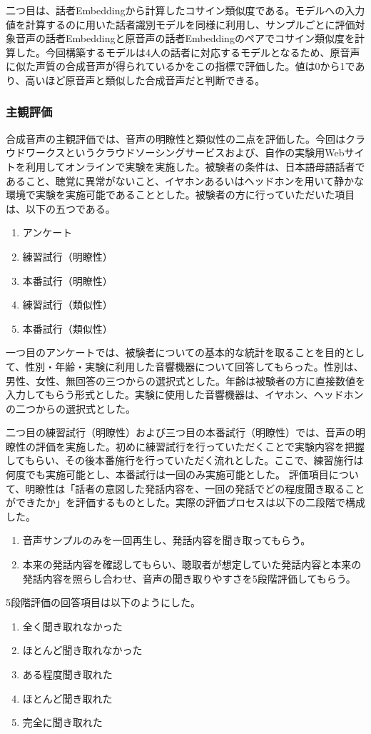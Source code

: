 \documentclass[12pt]{jarticle}
\numberwithin{equation}{section}    %
\numberwithin{figure}{section}      %
\numberwithin{table}{section}      %
\begin{document}
二つ目は、話者Embeddingから計算したコサイン類似度である。モデルへの入力値を計算するのに用いた話者識別モデルを同様に利用し、サンプルごとに評価対象音声の話者Embeddingと原音声の話者Embeddingのペアでコサイン類似度を計算した。今回構築するモデルは4人の話者に対応するモデルとなるため、原音声に似た声質の合成音声が得られているかをこの指標で評価した。値は0から1であり、高いほど原音声と類似した合成音声だと判断できる。

\subsubsection{主観評価}
\label{sec4:sec:sbj_explanation}
合成音声の主観評価では、音声の明瞭性と類似性の二点を評価した。今回はクラウドワークスというクラウドソーシングサービスおよび、自作の実験用Webサイトを利用してオンラインで実験を実施した。被験者の条件は、日本語母語話者であること、聴覚に異常がないこと、イヤホンあるいはヘッドホンを用いて静かな環境で実験を実施可能であることとした。被験者の方に行っていただいた項目は、以下の五つである。
\begin{enumerate}
    \item アンケート
    \item 練習試行（明瞭性）
    \item 本番試行（明瞭性）
    \item 練習試行（類似性）
    \item 本番試行（類似性）
\end{enumerate}

一つ目のアンケートでは、被験者についての基本的な統計を取ることを目的として、性別・年齢・実験に利用した音響機器について回答してもらった。性別は、男性、女性、無回答の三つからの選択式とした。年齢は被験者の方に直接数値を入力してもらう形式とした。実験に使用した音響機器は、イヤホン、ヘッドホンの二つからの選択式とした。

二つ目の練習試行（明瞭性）および三つ目の本番試行（明瞭性）では、音声の明瞭性の評価を実施した。初めに練習試行を行っていただくことで実験内容を把握してもらい、その後本番施行を行っていただく流れとした。ここで、練習施行は何度でも実施可能とし、本番試行は一回のみ実施可能とした。
評価項目について、明瞭性は「話者の意図した発話内容を、一回の発話でどの程度聞き取ることができたか」を評価するものとした。実際の評価プロセスは以下の二段階で構成した。
\begin{enumerate}
    \item 音声サンプルのみを一回再生し、発話内容を聞き取ってもらう。
    \item 本来の発話内容を確認してもらい、聴取者が想定していた発話内容と本来の発話内容を照らし合わせ、音声の聞き取りやすさを5段階評価してもらう。
\end{enumerate}
5段階評価の回答項目は以下のようにした。
\begin{enumerate}
    \item 全く聞き取れなかった
    \item ほとんど聞き取れなかった
    \item ある程度聞き取れた
    \item ほとんど聞き取れた
    \item 完全に聞き取れた
\end{enumerate}
\end{document}
